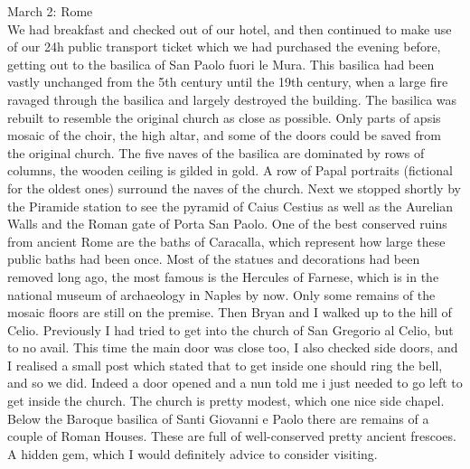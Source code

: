 March 2: Rome\\
We had breakfast and checked out of our hotel, and then continued to make use of our 24h public transport ticket which we had purchased the evening before, getting out to the basilica of San Paolo fuori le Mura. This basilica had been vastly unchanged from the 5th century until the 19th century, when a large fire ravaged through the basilica and largely destroyed the building. The basilica was rebuilt to resemble the original church as close as possible. Only parts of apsis mosaic of the choir, the high altar, and some of the doors could be saved from the original church. The five naves of the basilica are dominated by rows of columns, the wooden ceiling is gilded in gold. A row of Papal portraits (fictional for the oldest ones) surround the naves of the church. Next we stopped shortly by the Piramide station to see the pyramid of Caius Cestius as well as the Aurelian Walls and the Roman gate of Porta San Paolo. One of the best conserved ruins from ancient Rome are the baths of Caracalla, which represent how large these public baths had been once. Most of the statues and decorations had been removed long ago, the most famous is the Hercules of Farnese, which is in the national museum of archaeology in Naples by now. Only some remains of the mosaic floors are still on the premise. Then Bryan and I walked up to the hill of Celio. Previously I had tried to get into the church of San Gregorio al Celio, but to no avail. This time the main door was close too, I also checked side doors, and I realised a small post which stated that to get inside one should ring the bell, and so we did. Indeed a door opened and a nun told me i just needed to go left to get inside the church. The church is pretty modest, which one nice side chapel. Below the Baroque basilica of Santi Giovanni e Paolo there are remains of a couple of Roman Houses. These are full of well-conserved pretty ancient frescoes. A hidden gem, which I would definitely advice to consider visiting.\\

